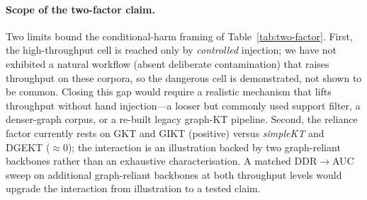 \documentclass[pdflatex,sn-mathphys-num]{sn-jnl}
\newcommand{\DDR}{\textsc{DDR}}
\begin{document}
\paragraph{Scope of the two-factor claim.}
Two limits bound the conditional-harm framing of Table~\ref{tab:two-factor}.
First, the high-throughput cell is reached only by \emph{controlled} injection;
we have not exhibited a natural workflow (absent deliberate contamination) that
raises throughput on these corpora, so the dangerous cell is demonstrated, not
shown to be common. Closing this gap would require a realistic mechanism that
lifts throughput without hand injection---a looser but commonly used support
filter, a denser-graph corpus, or a re-built legacy graph-KT pipeline. Second,
the reliance factor currently rests on GKT and GIKT (positive) versus
\textit{simpleKT} and DGEKT (${\approx}0$); the interaction is an illustration
backed by two graph-reliant backbones rather than an exhaustive
characterisation. A matched \DDR{}$\to$AUC sweep on additional graph-reliant
backbones at both throughput levels would upgrade the interaction from
illustration to a tested claim.
\end{document}
